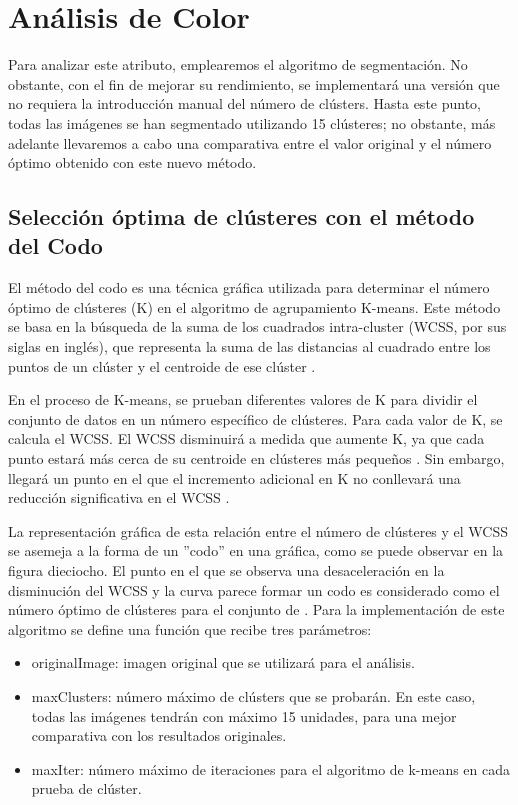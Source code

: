 \section{Análisis de Color}

Para analizar este atributo, emplearemos el algoritmo de segmentación. No obstante, con el fin de mejorar su rendimiento, se implementará una versión que no requiera la introducción manual del número de clústers. Hasta este punto, todas las imágenes se han segmentado utilizando 15 clústeres; no obstante, más adelante llevaremos a cabo una comparativa entre el valor original y el número óptimo obtenido con este nuevo método.


\subsection{Selección óptima de clústeres con el método del Codo}

El método del codo es una técnica gráfica utilizada para determinar el número óptimo de clústeres (K) en el algoritmo de agrupamiento K-means. Este método se basa en la búsqueda de la suma de los cuadrados intra-cluster (WCSS, por sus siglas en inglés), que representa la suma de las distancias al cuadrado entre los puntos de un clúster y el centroide de ese clúster \autocite{Zheng:2018}.

En el proceso de K-means, se prueban diferentes valores de K para dividir el conjunto de datos en un número específico de clústeres. Para cada valor de K, se calcula el WCSS. El WCSS disminuirá a medida que aumente K, ya que cada punto estará más cerca de su centroide en clústeres más pequeños \autocite{Anju:2019}. Sin embargo, llegará un punto en el que el incremento adicional en K no conllevará una reducción significativa en el WCSS \autocite{Dhanachandra:2015}.

La representación gráfica de esta relación entre el número de clústeres y el WCSS se asemeja a la forma de un ''codo'' en una gráfica, como se puede observar en la figura dieciocho. El punto en el que se observa una desaceleración en la disminución del WCSS y la curva parece formar un codo es considerado como el número óptimo de clústeres para el conjunto de \autocite{Sammouda:2021}. Para la implementación de este algoritmo se define una función que recibe tres parámetros:

\begin{itemize}
    \item originalImage: imagen original que se utilizará para el análisis.
    \item maxClusters: número máximo de clústers que se probarán. En este caso, todas las imágenes tendrán con máximo 15 unidades, para una mejor comparativa con los resultados originales.
    \item maxIter: número máximo de iteraciones para el algoritmo de k-means en cada prueba de clúster.
\end{itemize}

